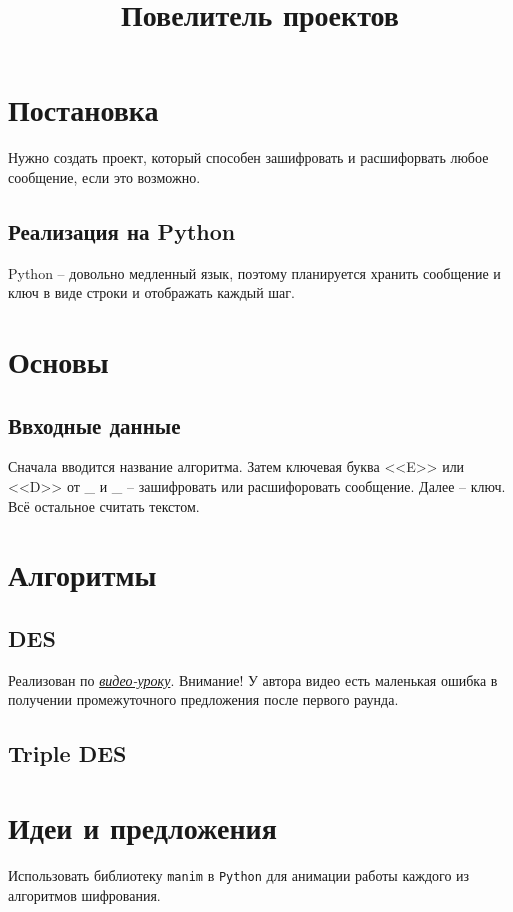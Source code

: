 \documentclass{article}
\title{Повелитель проектов}
\begin{document}
\maketitle
\tableofcontents
\newpage
\section{Постановка}
	Нужно создать проект, который способен зашифровать и расшифорвать любое сообщение, если это возможно.
	\subsection{Реализация на Python}
		Python -- довольно медленный язык, поэтому планируется хранить сообщение и ключ в виде строки и отображать каждый шаг.
\section{Основы}
	\subsection{Ввходные данные}
	Сначала вводится название алгоритма.
	Затем ключевая буква <<E>> или <<D>> от \_ и \_ -- зашифровать или расшифоровать сообщение.
	Далее -- ключ.
	Всё остальное считать текстом.\\
\section{Алгоритмы}
	\subsection{DES}
	Реализован по \href{https://www.youtube.com/watch?v=Qn6WIgvBUw4}{\textit{видео-уроку}}.
	Внимание! У автора видео есть маленькая ошибка в получении промежуточного предложения после первого раунда.
	\subsection{Triple DES}
\section{Идеи и предложения}
	Использовать библиотеку \texttt{manim} в \texttt{Python} для анимации работы каждого из алгоритмов шифрования.
\end{document}
